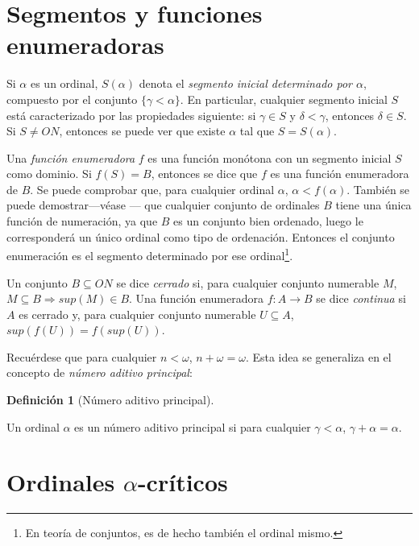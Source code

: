 \documentclass[11pt,a4paper]{book}
\theoremstyle{plain}
\theoremstyle{definition}
\newtheorem{definicion}[teorema]{Definición}
\theoremstyle{remark}
\begin{document}
\section{Segmentos y funciones enumeradoras}

Si $\alpha$ es un ordinal, $S(\alpha)$ denota el \textit{segmento inicial determinado por $\alpha$}, compuesto por el conjunto $\{ \gamma < \alpha \}$. En particular, cualquier segmento inicial $S$ está caracterizado por las propiedades siguiente: si $\gamma \in S$ y $\delta < \gamma$, entonces $\delta \in S$. Si $S \neq ON$, entonces se puede ver que existe $\alpha$ tal que $S = S(\alpha)$.

Una \textit{función enumeradora} $f$ es una función monótona con un segmento inicial $S$ como dominio. Si $f(S) = B$, entonces se dice que $f$ es una función enumeradora de $B$. Se puede comprobar que, para cualquier ordinal $\alpha$, $\alpha < f(\alpha)$. También se puede demostrar---véase \textcite[pp. 77-78]{schutte1977proof}--- que cualquier conjunto de ordinales $B$ tiene una única función de numeración, ya que $B$ es un conjunto bien ordenado, luego le corresponderá un único ordinal como tipo de ordenación. Entonces el conjunto enumeración es el segmento determinado por ese ordinal\footnote{En teoría de conjuntos, es de hecho también el ordinal mismo.}. 

Un conjunto $B \subseteq ON$ se dice \textit{cerrado} si, para cualquier conjunto numerable $M$, $M \subseteq B \Rightarrow sup(M) \in B$. Una función enumeradora $f: A \rightarrow B$ se dice \textit{continua} si $A$ es cerrado y, para cualquier conjunto numerable $U \subseteq A$, $sup(f(U)) = f(sup(U))$.

Recuérdese que para cualquier $n < \omega$, $ n + \omega = \omega$. Esta idea se generaliza en el concepto de \textit{número aditivo principal}:

\begin{definicion}[Número aditivo principal]
\label{def-numero-aditivo-principal}

Un ordinal $\alpha$ es un número aditivo principal si para cualquier $\gamma < \alpha$, $\gamma + \alpha = \alpha$.

\end{definicion}

\section{Ordinales \texorpdfstring{$\alpha$}{alfa}-críticos}
\end{document}
